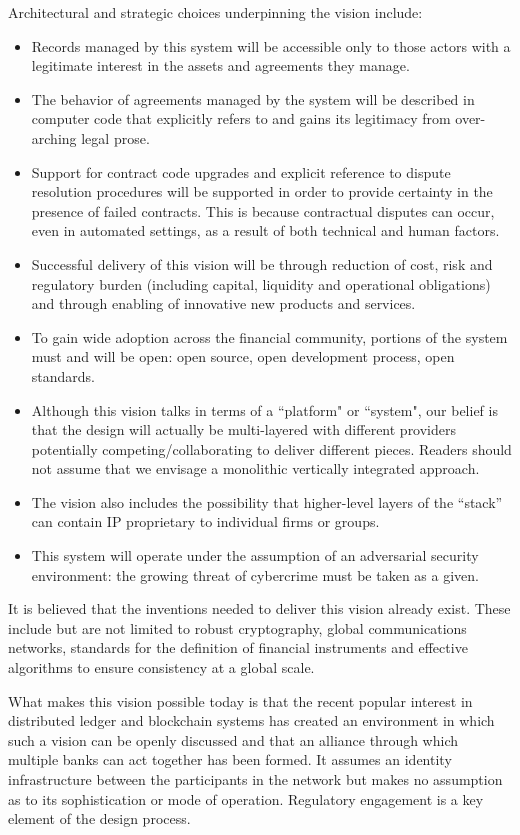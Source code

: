 \documentclass{article}
\begin{document}
Architectural and strategic choices underpinning the vision include:
\begin{itemize} 
\item Records managed by this system will be accessible only to those actors with a legitimate interest in the assets and agreements they manage.
\item The behavior of agreements managed by the system will be described in computer code that explicitly refers to and gains its legitimacy from over-arching legal prose.\cite{Ricardian}
\item Support for contract code upgrades and explicit reference to dispute resolution procedures will be supported in order to provide certainty in the presence of failed contracts. This is because contractual disputes can occur, even in automated settings, as a result of both technical and human factors. 
\item Successful delivery of this vision will be through reduction of cost, risk and regulatory burden (including capital, liquidity and operational obligations) and through enabling of innovative new products and services.
\item To gain wide adoption across the financial community, portions of the system must and will be open: open source, open development process, open standards.
\item Although this vision talks in terms of a ``platform" or ``system", our belief is that the design will actually be multi-layered with different providers potentially competing/collaborating to deliver different pieces. Readers should not assume that we envisage a monolithic vertically integrated approach.
\item The vision also includes the possibility that higher-level layers of the “stack” can contain IP proprietary to individual firms or groups.
\item This system will operate under the assumption of an adversarial security environment: the growing threat of cybercrime must be taken as a given.
\end{itemize}
It is believed that the inventions needed to deliver this vision already exist. These include but are not limited to robust cryptography, global communications networks, standards for the definition of financial instruments and effective algorithms to ensure consistency at a global scale. 

What makes this vision possible today is that the recent popular interest in distributed ledger and blockchain systems has created an environment in which such a vision can be openly discussed and that an alliance through which multiple banks can act together has been formed. It assumes an identity infrastructure between the participants in the network but makes no assumption as to its sophistication or mode of operation. Regulatory engagement is a key element of the design process.
\end{document}
